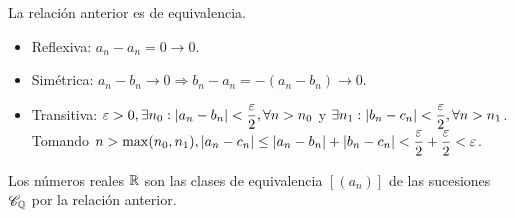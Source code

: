 \clearpage

\begin{prop}
  La relación anterior es de equivalencia. \begin{itemize}
    \item Reflexiva: \(a_n - a_n = 0 \to 0\).
    \item Simétrica: \(a_n - b_n \to 0 \Rightarrow b_n - a_n = -(a_n-b_n) \to 0\).
    \item Transitiva: \(\varepsilon > 0, \exists n_0 : |a_n - b_n| < \dfrac{\varepsilon}{2}, \forall n > n_0\)
          y \(\exists n_1 : |b_n - c_n| < \dfrac{\varepsilon}{2}, \forall n > n_1\). Tomando \(n > \max(n_0, n_1), |a_n - c_n| \leq |a_n - b_n| + |b_n - c_n| < \dfrac{\varepsilon}{2} + \dfrac{\varepsilon}{2} < \varepsilon \).
  \end{itemize}
\end{prop}

\begin{definition}
  Los números reales \(\mathbb{R} \) son las clases de equivalencia \([(a_n)]\) de las sucesiones \(\mathscr{C}_{\mathbb{Q}} \) por la relación anterior.
\end{definition}

